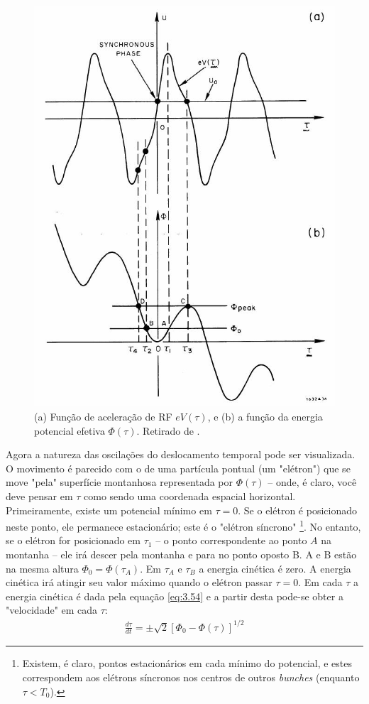 \begin{figure}[!htb]
	\centering
	\includegraphics[width=0.9\linewidth]{./Figuras/fig36.jpeg}
	\caption{(a) Função de aceleração de RF $eV(\tau)$, e (b) a função da energia potencial efetiva $\Phi(\tau)$. Retirado de \cite{sands1970physics}.}
	\label{fig:fig36}
\end{figure}

Agora a natureza das oscilações do deslocamento temporal pode ser visualizada. O movimento é parecido com o de uma partícula pontual (um "elétron") que se move "pela" superfície montanhosa representada por $\Phi(\tau)$ -- onde, é claro, você deve pensar em $\tau$ como sendo uma coordenada espacial horizontal. Primeiramente, existe um potencial mínimo em $\tau=0$. Se o elétron é posicionado neste ponto, ele permanece estacionário; este é o "elétron síncrono" \footnote{Existem, é claro, pontos estacionários em cada mínimo do potencial, e estes correspondem aos elétrons síncronos nos centros de outros \textit{bunches} (enquanto $\tau<T_0$).}. No entanto, se o elétron for posicionado em $\tau_1$ -- o ponto correspondente ao ponto $A$ na montanha -- ele irá descer pela montanha e para no ponto oposto B. A e B estão na mesma altura $\Phi_0 = \Phi(\tau_A)$. Em $\tau_A$ e $\tau_B$ a energia cinética é zero. A energia cinética irá atingir seu valor máximo quando o elétron passar $\tau=0$. Em cada $\tau$ a energia cinética é dada pela equação \eqref{eq:3.54} e a partir desta pode-se obter a "velocidade" em cada $\tau$:
\begin{align}
	\frac{d\tau}{dt} = \pm \sqrt{2}[\Phi_0 - \Phi(\tau)]^{1/2}
\end{align}

